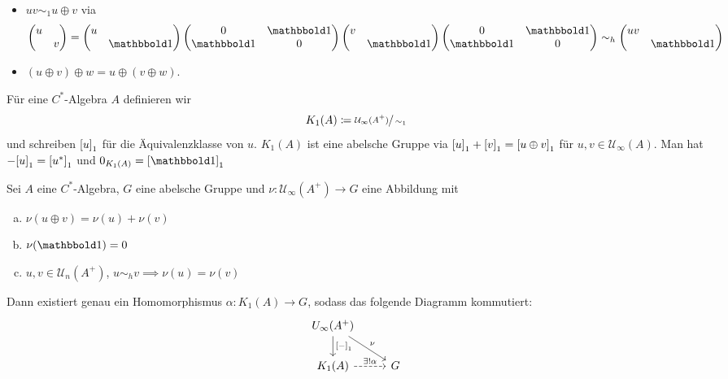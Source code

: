 \begin{definitionP}[label=def:81]
\begin{itemize}
		\item $uv \sim_1 u \oplus v$ via
		\[
			\begin{pmatrix}
				u & \\ & v
			\end{pmatrix} = \begin{pmatrix}
				u & \\ & \ind 
			\end{pmatrix} \begin{pmatrix}
				0 & \ind \\ \ind & 0
			\end{pmatrix}
			\begin{pmatrix}
				v & \\ & \ind
			\end{pmatrix}
			\begin{pmatrix}
				0 & \ind \\ \ind & 0
			\end{pmatrix}
			\sim_h \begin{pmatrix}
				uv & \\ & \ind
			\end{pmatrix}
		\]
		\item $(u \oplus v) \oplus w = u \oplus  (v \oplus w)$.
	\end{itemize}
\end{definitionP}

\begin{definitionP}
	Für eine $C^*$-Algebra $A$ definieren wir 
	\[
		K_1(A) \coloneqq \sfrac{\mathcal{U}_\infty(A^+)}{\sim_1}
	\]
	und schreiben $\benbrace*{u}_1$ für die Äquivalenzklasse von $u$.
	$K_1(A)$ ist eine abelsche Gruppe via $\benbrace*{u}_1 + \benbrace*{v}_1 = \benbrace*{u \oplus v}_1$ für $u,v \in \mathcal{U}_\infty(A)$.
	Man hat $- \benbrace*{u}_1 = \benbrace*{u^*}_1$ und $0_{K_1(A)} = \benbrace*{\ind}_1$
\end{definitionP}

\begin{proposition}[label=prop:83]
	Sei $A$ eine $C^*$-Algebra, $G$ eine abelsche Gruppe und $\nu \colon \mathcal{U}_\infty(A^+) \to G$ eine Abbildung mit 
	\begin{enumerate}[a)]
		\item $\nu(u \oplus v) = \nu(u) + \nu(v)$
		\item $\nu(\ind)=0$
		\item $u,v \in \mathcal{U}_n(A^+)$, $u \sim_h v \implies \nu(u) = \nu(v)$
	\end{enumerate}
	Dann existiert genau ein Homomorphismus $\alpha \colon K_1(A) \to G$, sodass das folgende Diagramm kommutiert:
	\[
		\begin{tikzcd}
			U_\infty(A^+) \dar["\benbrace*{-}_1"] \drar["\nu"] \\
			K_1(A) \rar[dashed,"\exists ! \alpha"] & G
		\end{tikzcd}
	\]
\end{proposition}

